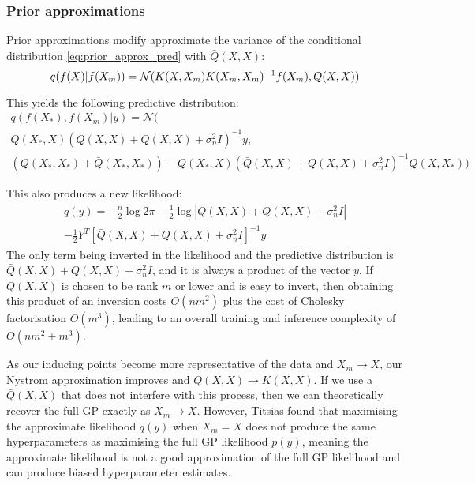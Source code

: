 \subsubsection{Prior approximations}
Prior approximations modify approximate the variance of the conditional distribution \ref{eq:prior_approx_pred} with $\bar{Q}(X, X)$:
\begin{equation*}
    q(f(X) | f(X_m)) = \mathcal{N}( \\
        K(X, X_m) K(X_m, X_m)^{-1} f(X_m), \\
        \bar{Q}(X, X)
    )
\end{equation*}

This yields the following predictive distribution:
\begin{equation} \label{eq:prior_approx_pred}
    \begin{aligned}
        q(f(X_*), f(X_m) | y ) = \mathcal{N}( \\
        Q(X_*, X) \left( \bar{Q}(X, X) + Q(X, X) + \sigma_n^2 I \right)^{-1} y, \\
        \left( Q(X_*, X_*) + \bar{Q}(X_*, X_*) \right) - Q(X_*, X) \left( \bar{Q}(X, X) + Q(X, X) + \sigma_n^2 I \right)^{-1} Q(X, X_*)
    )
    \end{aligned}
\end{equation}

This also produces a new likelihood:
\begin{equation} \label{eq:prior_approx_likelihood}
    \begin{aligned}
        q(y) = -\frac{n}{2} \log 2\pi
        - \frac{1}{2} \log | \bar{Q}(X, X) + Q(X, X) + \sigma_n^2 I | \\
        - \frac{1}{2} Y^T [\bar{Q}(X, X) + Q(X, X) + \sigma_n^2 I]^{-1} y
    \end{aligned}
\end{equation}
The only term being inverted in the likelihood and the predictive distribution is $\bar{Q}(X, X) + Q(X, X) + \sigma_n^2 I$, and it is always a product of the vector $y$. If $\bar{Q}(X, X)$ is chosen to be rank $m$ or lower and is easy to invert, then obtaining this product of an inversion costs $O(nm^2)$ plus the cost of Cholesky factorisation $O(m^3)$, leading to an overall training and inference complexity of $O(nm^2 + m^3)$.

As our inducing points become more representative of the data and $X_m \to X$, our Nystrom approximation improves and $Q(X, X) \to K(X, X)$. If we use a $\bar{Q}(X, X)$ that does not interfere with this process, then we can theoretically recover the full GP exactly as $X_m \to X$. However, Titsias \cite{vfe} found that maximising the approximate likelihood $q(y)$ when $X_m = X$ does not produce the same hyperparameters as maximising the full GP likelihood $p(y)$, meaning the approximate likelihood is not a good approximation of the full GP likelihood and can produce biased hyperparameter estimates.


